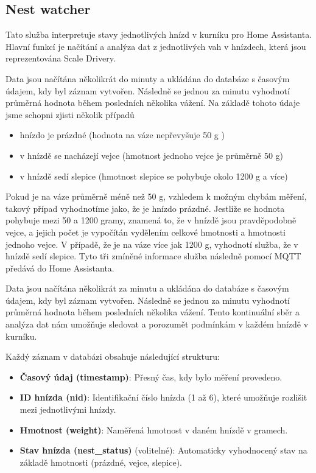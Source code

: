 
\subsection{Nest watcher}\label{subsec:nest-watcher}
Tato služba interpretuje stavy jednotlivých hnízd v kurníku pro Home Assistanta.
Hlavní funkcí je načítání a analýza dat z jednotlivých vah v hnízdech, která jsou reprezentována Scale Drivery.\newline


Data jsou načítána několikrát do minuty a ukládána do databáze s časovým údajem, kdy byl záznam vytvořen.
Následně se jednou za minutu vyhodnotí průměrná hodnota během posledních několika vážení.
Na základě tohoto údaje jsme schopni zjisti několik případů
\begin{itemize}
    \item hnízdo je prázdné (hodnota na váze nepřevyšuje 50 g )
    \item v hnízdě se nacházejí vejce (hmotnost jednoho vejce je průměrně 50 g)
    \item v hnízdě sedí slepice (hmotnost slepice se pohybuje okolo 1200 g a více)
\end{itemize}
Pokud je na váze průměrně méně než 50 g, vzhledem k možným chybám měření, takový případ vyhodnotíme jako, že je hnízdo prázdné.
Jestliže se hodnota pohybuje mezi 50 a 1200 gramy, znamená to, že v hnízdě jsou pravděpodobně vejce, a jejich počet je vypočítán vydělením celkové hmotnosti a hmotnosti jednoho vejce.
V případě, že je na váze více jak 1200 g, vyhodnotí služba, že v hnízdě sedí slepice.
Tyto tři zmíněné informace služba následně pomocí MQTT předává do Home Assistanta.


Data jsou načítána několikrát za minutu a ukládána do databáze s časovým údajem, kdy byl záznam vytvořen. Následně se jednou za minutu vyhodnotí průměrná hodnota během posledních několika vážení. Tento kontinuální sběr a analýza dat nám umožňuje sledovat a porozumět podmínkám v každém hnízdě v kurníku.

Každý záznam v databázi obsahuje následující strukturu:
\begin{itemize}
    \item \textbf{Časový údaj (timestamp)}: Přesný čas, kdy bylo měření provedeno.
    \item \textbf{ID hnízda (nid)}: Identifikační číslo hnízda (1 až 6), které umožňuje rozlišit mezi jednotlivými hnízdy.
    \item \textbf{Hmotnost (weight)}: Naměřená hmotnost v daném hnízdě v gramech.
    \item \textbf{Stav hnízda (nest\_status)} (volitelné): Automaticky vyhodnocený stav na základě hmotnosti (prázdné, vejce, slepice).
\end{itemize}

